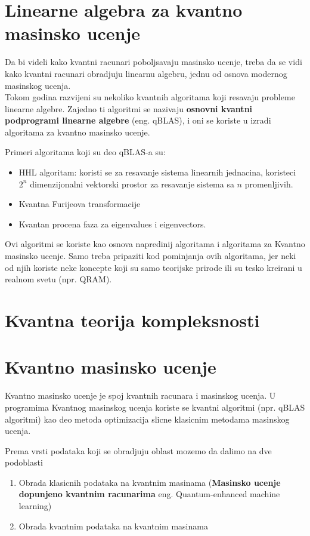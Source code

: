 \documentclass[12pt, letterpaper, oneside]{article}
\begin{document}
\section{Linearne algebra za kvantno masinsko ucenje}
Da bi videli kako kvantni racunari poboljsavaju masinsko ucenje, treba da se vidi kako kvantni racunari obradjuju linearnu algebru, jednu od osnova modernog masinskog ucenja. \\
Tokom godina razvijeni su nekoliko kvantnih algoritama koji resavaju probleme linearne algebre.
Zajedno ti algoritmi se nazivaju \textbf{osnovni kvantni podprogrami linearne algebre} (eng. qBLAS), i oni se koriste u izradi algoritama za kvantno masinsko ucenje.

Primeri algoritama koji su deo qBLAS-a su: 
\begin{itemize}
    \item HHL algoritam: koristi se za resavanje sistema linearnih jednacina, koristeci $2^n$ dimenzijonalni vektorski prostor
        za resavanje sistema sa $n$ promenljivih. \cite{Quantum_machine_learning}
    \item Kvantna Furijeova transformacije \cite{Classical&quantum_info_Fourie_Phase}
    \item Kvantan procena faza za eigenvalues i eigenvectors. \cite{Classical&quantum_info_Fourie_Phase}
\end{itemize}
Ovi algoritmi se koriste kao osnova napredinij algoritama i algoritama za Kvantno masinsko ucenje.
Samo treba pripaziti kod pominjanja ovih algoritama, jer neki od njih koriste neke koncepte koji su samo
teorijske prirode ili su tesko kreirani u realnom svetu (npr. QRAM).
\section{Kvantna teorija kompleksnosti}
\section{Kvantno masinsko ucenje}
Kvantno masinsko ucenje je spoj kvantnih racunara i masinskog ucenja. U programima Kvantnog masinskog ucenja koriste se kvantni algoritmi (npr. qBLAS algoritmi)
kao deo metoda optimizacija slicne klasicnim metodama masinskog ucenja. 

Prema vrsti podataka koji se obradjuju oblast mozemo da dalimo na dve podoblasti
\begin{enumerate}
    \item Obrada klasicnih podataka na kvantnim masinama (\textbf{Masinsko ucenje dopunjeno kvantnim racunarima} eng. Quantum-enhanced machine learning)
    \item Obrada kvantnim podataka na kvantnim masinama
\end{enumerate}

\newpage
\printbibliography
\end{document}
